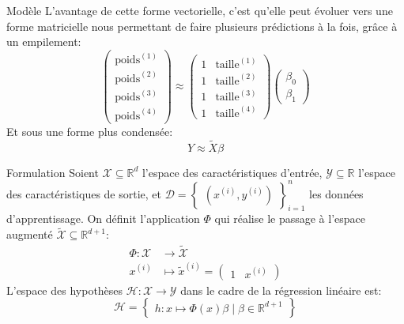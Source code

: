 \begin{frame}{Modèle}
	L'avantage de cette forme vectorielle, c'est qu'elle peut évoluer vers une forme matricielle nous permettant de faire plusieurs prédictions à la fois, grâce à un empilement:
	\begin{equation}
		\begin{pmatrix}\text{poids}^{(1)} \\ \text{poids}^{(2)} \\ \text{poids}^{(3)} \\ \text{poids}^{(4)}\end{pmatrix} \approx \begin{pmatrix}1 & \text{taille}^{(1)} \\ 1 & \text{taille}^{(2)} \\ 1 & \text{taille}^{(3)} \\ 1 & \text{taille}^{(4)} \end{pmatrix} \begin{pmatrix}\beta_0 \\ \beta_1\end{pmatrix}
		\nonumber
	\end{equation}
	\pause
	Et sous une forme plus condensée:
	\begin{equation}
		Y \approx \tilde{X} \beta
		\nonumber
	\end{equation}
\end{frame}

\begin{frame}{Formulation}
	Soient $\mathcal{X} \subseteq \mathbb{R}^d$ l'espace des caractéristiques d'entrée,  $\mathcal{Y} \subseteq \mathbb{R}$ l'espace des caractéristiques de sortie, et $\mathcal{D} = \begin{Bmatrix}(x^{(i)}, y^{(i)})\end{Bmatrix}_{i=1}^n$ les données d'apprentissage. On définit l'application $\Phi$ qui réalise le passage à l'espace augmenté $\tilde{\mathcal{X}} \subseteq \mathbb{R}^{d+1}$:
	\begin{equation}
		\begin{aligned}
			\Phi: \mathcal{X} &\to \tilde{\mathcal{X}} \\
			x^{(i)} &\mapsto \tilde{x}^{(i)} = \begin{pmatrix}1 & x^{(i)}\end{pmatrix}
			\nonumber
		\end{aligned}
	\end{equation}
	L'espace des hypothèses $\mathcal{H}: \mathcal{X} \to \mathcal{Y}$ dans le cadre de la régression linéaire est:
	\begin{equation}
		\mathcal{H} = \begin{Bmatrix}h: x \mapsto \Phi(x) \beta \mid \beta \in \mathbb{R}^{d+1}\end{Bmatrix}
		\nonumber
	\end{equation}
\end{frame}

